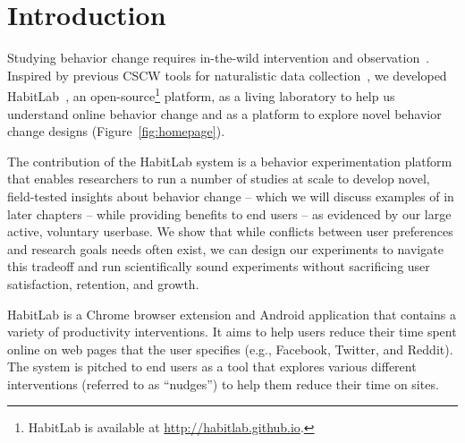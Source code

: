 \section{Introduction}



Studying behavior change requires in-the-wild intervention and observation~\cite{consolvo2008activity}. Inspired by previous CSCW tools for naturalistic data collection~\cite{reinecke2015labinthewild}, we developed HabitLab~\cite{habitlab}, an open-source\footnote{HabitLab is available at \url{http://habitlab.github.io}.} platform, as a living laboratory to help us understand online behavior change and as a platform to explore novel behavior change designs (Figure~\ref{fig:homepage}).

The contribution of the HabitLab system is a behavior experimentation platform that enables researchers to run a number of studies at scale to develop novel, field-tested insights about behavior change -- which we will discuss examples of in later chapters -- while providing benefits to end users -- as evidenced by our large active, voluntary userbase. We show that while conflicts between user preferences and research goals needs often exist, we can design our experiments to navigate this tradeoff and run scientifically sound experiments without sacrificing user satisfaction, retention, and growth.



HabitLab is a Chrome browser extension and Android application that contains a variety of productivity interventions. It aims to help users reduce their time spent online on web pages that the user specifies (e.g., Facebook, Twitter, and Reddit). The system is pitched to end users as a tool that explores various different interventions (referred to as ``nudges'') to help them reduce their time on sites.


